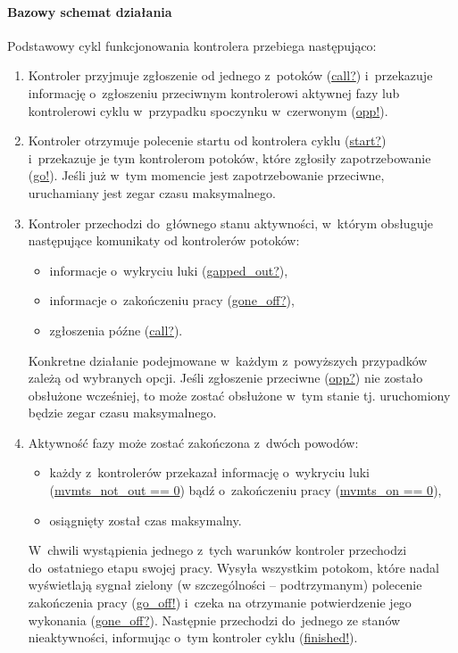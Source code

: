 \documentclass{pracamgr}
\theoremstyle{plain}
\begin{document}
\paragraph{Bazowy schemat działania} Podstawowy cykl funkcjonowania
kontrolera przebiega następująco:
\begin{enumerate}
  \item Kontroler przyjmuje zgłoszenie od jednego z~potoków (\url{call?})
  i~przekazuje informację o~zgłoszeniu przeciwnym kontrolerowi aktywnej
  fazy lub kontrolerowi cyklu w~przypadku spoczynku w~czerwonym (\url{opp!}).
  \item Kontroler otrzymuje polecenie startu od kontrolera cyklu
  (\url{start?}) i~przekazuje je tym kontrolerom potoków, które
  zgłosiły zapotrzebowanie (\url{go!}). Jeśli już w~tym momencie jest
  zapotrzebowanie przeciwne, uruchamiany jest zegar czasu
  maksymalnego.
  \item Kontroler przechodzi do~głównego stanu aktywności, w~którym obsługuje
  następujące komunikaty od kontrolerów potoków:
  \begin{itemize}
    \item informacje o~wykryciu luki (\url{gapped_out?}),
    \item informacje o~zakończeniu pracy (\url{gone_off?}),
    \item zgłoszenia późne (\url{call?}).
  \end{itemize}
  Konkretne działanie podejmowane w~każdym z~powyższych przypadków
  zależą od wybranych opcji. Jeśli zgłoszenie przeciwne
  (\url{opp?}) nie zostało obsłużone wcześniej, to może zostać
  obsłużone w~tym stanie tj. uruchomiony będzie zegar czasu
  maksymalnego.
  \item Aktywność fazy może zostać zakończona z~dwóch powodów:
  \begin{itemize}
    \item każdy z~kontrolerów przekazał informację o~wykryciu luki
    (\url{mvmts_not_out == 0}) bądź o~zakończeniu pracy
    (\url{mvmts_on == 0}),
    \item osiągnięty został czas maksymalny.
  \end{itemize}
  W~chwili wystąpienia jednego z~tych warunków kontroler przechodzi
  do~ostatniego etapu swojej pracy. Wysyła wszystkim potokom, które nadal
  wyświetlają sygnał zielony (w szczególności -- podtrzymanym)
  polecenie zakończenia pracy (\url{go_off!}) i~czeka na otrzymanie
  potwierdzenie jego wykonania (\url{gone_off?}). Następnie przechodzi
  do~jednego ze stanów nieaktywności, informując o~tym kontroler cyklu
  (\url{finished!}).
\end{enumerate}
\end{document}
